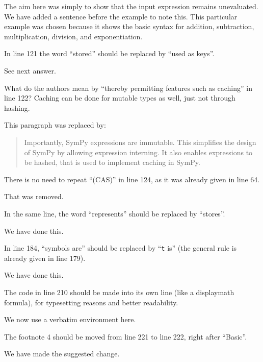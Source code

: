 \documentclass[answers,12pt]{exam}
\begin{document}
\begin{questions}
\begin{solution}
The aim here was simply to show that the input expression remains unevaluated.
We have added a sentence before the example to note this.
This particular example was chosen because it shows the basic syntax for
addition, subtraction, multiplication, division, and exponentiation.
\end{solution}

\question In line 121 the word ``stored'' should be replaced by ``used as keys''.
\begin{solution}
See next answer.
\end{solution}

\question What do the authors mean by ``thereby permitting features such as caching'' in line 122? Caching can be done for mutable types as well, just not through hashing.
\begin{solution}
This paragraph was replaced by:
\begin{quote}
Importantly, SymPy expressions are immutable. This simplifies the design of
SymPy by allowing expression interning. It also enables expressions to be
hashed, that is used to implement caching in SymPy.
\end{quote}
\end{solution}

\question There is no need to repeat ``(CAS)'' in line 124, as it was already given in line 64.
\begin{solution}
That was removed.
\end{solution}

\question In the same line, the word ``represents'' should be replaced by ``stores''.
\begin{solution}
We have done this.
\end{solution}

\question In line 184, ``symbols are'' should be replaced by ``\texttt{t} is'' (the general rule is already given in line 179).
\begin{solution}
We have done this.
\end{solution}

\question The code in line 210 should be made into its own line (like a displaymath formula), for typesetting reasons and better readability.
\begin{solution}
We now use a verbatim environment here.
\end{solution}

\question The footnote 4 should be moved from line 221 to line 222, right after ``Basic''.
\label{rev3point16}
\begin{solution}
We have made the suggested change.
\end{solution}


\end{questions}
\end{document}
